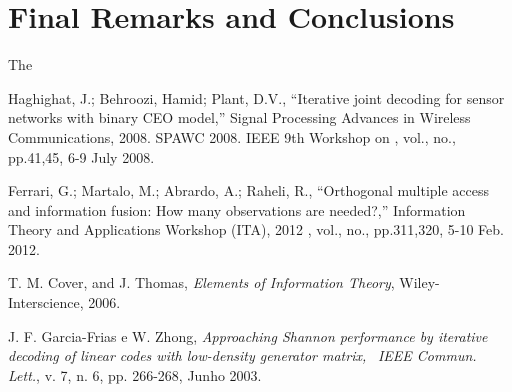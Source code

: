 \documentclass[journal]{IEEEtran}
\begin{document}
\section{Final Remarks and Conclusions} 
\label{sec:Conclusions}
The


\begin{thebibliography}{99}


 Haghighat, J.; Behroozi, Hamid; Plant, D.V., 
``Iterative joint decoding for sensor networks with binary CEO model,'' 
Signal Processing Advances in Wireless Communications, 2008. SPAWC 2008. 
IEEE 9th Workshop on , vol., no., pp.41,45, 6-9 July 2008.

 Ferrari, G.; Martalo, M.; Abrardo, A.; Raheli, R., 
``Orthogonal multiple access and information fusion: How many observations are needed?,'' 
Information Theory and Applications Workshop (ITA), 2012 , vol., no., pp.311,320, 5-10 Feb. 2012.


T. M. Cover, and J. Thomas, \textit{Elements of Information Theory}, Wiley-Interscience, 2006.


 J. F. Garcia-Frias e W. Zhong, \emph{Approaching Shannon performance by
iterative decoding of linear codes with low-density generator matrix,}
~\textit{IEEE Commun. Lett.}, v. 7, n. 6, pp. 266-268, Junho 2003.


\end{thebibliography}
\end{document}
